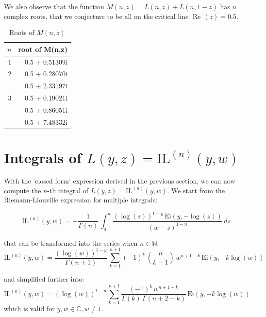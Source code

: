 \documentclass[a4paper,11pt,twoside]{amsart}
\newcommand\Ei{\mathrm{Ei}}
\newcommand\IL{\mathrm{IL}}
\renewcommand\Re{{\operatorname{Re\,}}}
\begin{document}
We also observe that the function $M(n,z) = L(n,z) + L(n,1-z)$ has $n$ complex roots, that we conjecture to be all on the critical line $\Re(z)=0.5$.

\begin{table}[H]
  \begin{center}
    \begin{tabular}{r|r} %
      $n$ & root of M(n,z)\\
      \hline
      1 & 0.5 + 0.51309i\\
      \hline
      2 & 0.5 + 0.28070i\\&0.5 + 2.33197i\\
      \hline
      3 & 0.5 + 0.19021i\\&0.5 + 0.86051i\\&0.5 + 7.48332i\\
    \end{tabular}
  \end{center}
  \caption{Roots of $M(n,z)$}
\end{table}
\vspace{-2em}

\section{Integrals of $L(y,z) = \IL^{(n)}(y,w)$}

With the 'closed form' expression derived in the previous section, we can now compute the $n$-th integral of $L(y,z) = \IL^{(n)}(y,w)$. We start from the Riemann-Liouville expression for multiple integrals:

\begin{equation}\label{rootscomp2}
\IL^{(n)}(y,w) = -\frac{1}{\Gamma(n)}\,\int_{0}^{w} \frac{\left(\log(z)\right)^{1-y}\,\Ei\left(y, -\log(z)\right)}{(w-z)^{1-n}}\, dz
\end{equation}

that can be transformed into the series when $n \in \mathbb{N}$:
\begin{equation}\label{rootscomp3}
\IL^{(n)}(y,w) = \frac{\left(\log(w)\right)^{1-y}}{\Gamma(n+1)}\,\sum_{k=1}^{n+1} (-1)^k\, \binom{n}{k-1}\,w^{n+1-k} \,\Ei\left(y, -k\log(w)\right)
\end{equation}

and simplified further into:
\begin{equation}\label{rootscomp4}
\IL^{(n)}(y,w) = \left(\log(w)\right)^{1-y}\,\sum_{k=1}^{n+1} \frac{(-1)^k\,w^{n+1-k}}{\Gamma(k)\,\Gamma(n+2-k)} \,\Ei\left(y, -k\log(w)\right)
\end{equation}
which is valid for $y,w \in \mathbb{C}, w \ne 1$.
\end{document}
